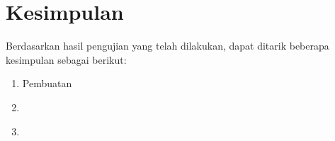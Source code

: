 \section{Kesimpulan}
\label{sec:kesimpulan}

Berdasarkan hasil pengujian yang telah dilakukan, dapat ditarik beberapa kesimpulan sebagai berikut:

\begin{enumerate}[nolistsep]

  \item Pembuatan \textcolor{red}{\lipsum[2][1-3]}

  \item \textcolor{red}{\lipsum[2][4-6]}

  \item \textcolor{red}{\lipsum[2][7-10]}

\end{enumerate}
